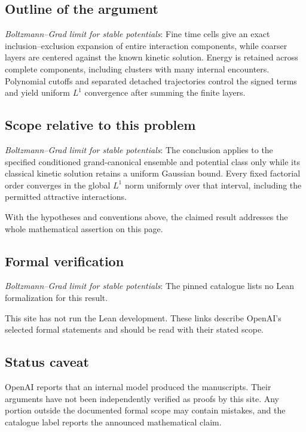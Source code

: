 \documentclass[11pt]{article}
\begin{document}
\subsection{Outline of the argument}
\textit{Boltzmann--Grad limit for stable potentials}: Fine time cells give an exact inclusion--exclusion expansion of entire interaction components, while coarser layers are centered against the known kinetic solution. Energy is retained across complete components, including clusters with many internal encounters. Polynomial cutoffs and separated detached trajectories control the signed terms and yield uniform $L^1$ convergence after summing the finite layers.

\subsection{Scope relative to this problem}
\textit{Boltzmann--Grad limit for stable potentials}: The conclusion applies to the specified conditioned grand-canonical ensemble and potential class only while its classical kinetic solution retains a uniform Gaussian bound. Every fixed factorial order converges in the global $L^1$ norm uniformly over that interval, including the permitted attractive interactions.

With the hypotheses and conventions above, the claimed result addresses the whole mathematical assertion on this page.

\subsection{Formal verification}
\textit{Boltzmann--Grad limit for stable potentials}: The pinned catalogue lists no Lean formalization for this result.

This site has not run the Lean development. These links describe OpenAI’s selected formal statements and should be read with their stated scope.

\subsection{Status caveat}
OpenAI reports that an internal model produced the manuscripts. Their arguments have not been independently verified as proofs by this site. Any portion outside the documented formal scope may contain mistakes, and the catalogue label reports the announced mathematical claim.
\end{document}
